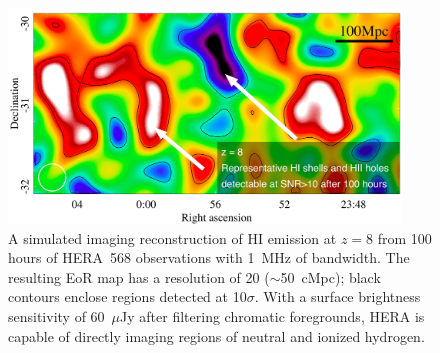 \documentclass[preprint]{aastex}
\def\HI{{H{\small I }}}
\begin{document}

\begin{figure}[t] \centering
\includegraphics[height=2.25in]{plots/HERA_z8_SNR_wide_annotated.jpg}
\caption{\small 
A simulated imaging reconstruction of \HI emission at $z=8$ from 
100 hours of HERA~568 observations with 1~MHz of bandwidth.  The resulting
EoR map has a resolution of 20\arcmin 
($\sim$50~cMpc); black contours
enclose regions detected at 10$\sigma$.
With a surface brightness sensitivity of 60~$\mu$Jy after filtering chromatic
foregrounds, HERA is capable of
directly imaging regions of neutral and ionized hydrogen.
\label{imaging}}
\end{figure}
\end{document}

